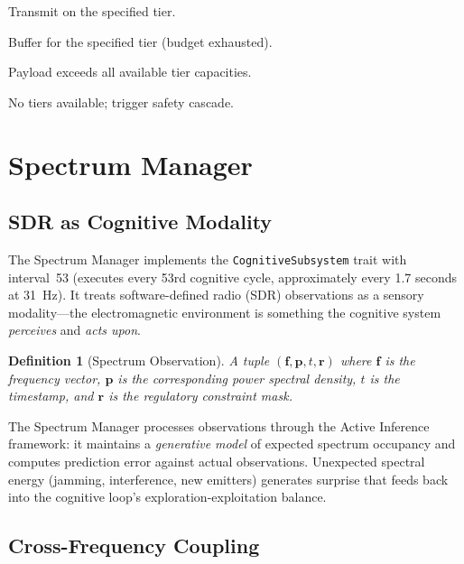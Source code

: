\documentclass[11pt,twocolumn]{article}
\newtheorem{definition}{Definition}
\begin{document}
\begin{description}[nosep]
  \item[\texttt{Send(tier, data)}] Transmit on the specified tier.
  \item[\texttt{Queue(tier)}] Buffer for the specified tier (budget exhausted).
  \item[\texttt{Drop}] Payload exceeds all available tier capacities.
  \item[\texttt{Degrade(health)}] No tiers available; trigger safety cascade.
\end{description}

\section{Spectrum Manager}

\subsection{SDR as Cognitive Modality}

The Spectrum Manager implements the \texttt{CognitiveSubsystem} trait with
interval~53 (executes every 53rd cognitive cycle, approximately every 1.7
seconds at 31~Hz). It treats software-defined radio (SDR) observations as
a sensory modality---the electromagnetic environment is something the
cognitive system \emph{perceives} and \emph{acts upon}.

\begin{definition}[Spectrum Observation]
A tuple $(\mathbf{f}, \mathbf{p}, t, \mathbf{r})$ where $\mathbf{f}$ is the
frequency vector, $\mathbf{p}$ is the corresponding power spectral density,
$t$ is the timestamp, and $\mathbf{r}$ is the regulatory constraint mask.
\end{definition}

The Spectrum Manager processes observations through the Active Inference
framework: it maintains a \emph{generative model} of expected spectrum
occupancy and computes prediction error against actual observations.
Unexpected spectral energy (jamming, interference, new emitters) generates
surprise that feeds back into the cognitive loop's exploration-exploitation
balance.

\subsection{Cross-Frequency Coupling}
\end{document}
